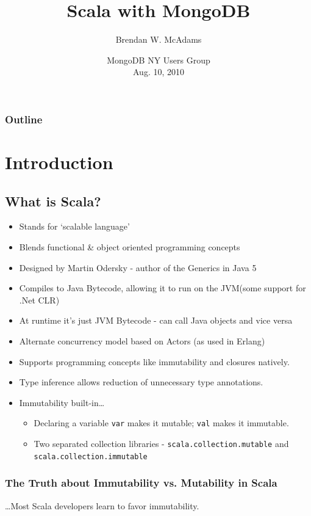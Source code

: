 \documentclass{beamer}
\title[Integrating Scala + MongoDB]{Scala with MongoDB} %
\author[B.W. McAdams]{Brendan W. McAdams}
\institute[Novus Partners]{Novus Partners, Inc.}
\date[MongoDB NY - 8/10/10]
     {MongoDB NY Users Group\\ Aug. 10, 2010}
\newenvironment{itemizeframe}
               {\begin{frame}\startitemizeframe} 
               {\stopitemizeframe\end{frame}}
\newcommand\startitemizeframe{\begin{itemize}} \newcommand\stopitemizeframe{\end{itemize}}
\begin{document}
\begin{frame}
  \titlepage
\end{frame}

\begin{frame}
\frametitle{Outline}
  \tableofcontents
\end{frame}

\section{Introduction}

\subsection{What is Scala?}
\begin{itemizeframe}
    \frametitle{What Is Scala?}
    \item Stands for `scalable language'
    \item Blends functional \& object oriented programming concepts
    \item Designed by Martin Odersky - author of the Generics in Java 5
    \item Compiles to Java Bytecode, allowing it to run on the JVM(some support for .Net CLR)
    \item At runtime it's just JVM Bytecode - can call Java objects and vice versa    
    \item Alternate concurrency model based on Actors (as used in Erlang)
    \item Supports programming concepts like immutability and closures natively.
    \item Type inference allows reduction of unnecessary type annotations.
    \item Immutability built-in\ldots
        \begin{itemize}
            \item Declaring a variable \texttt{var} makes it mutable;  \texttt{val} makes it immutable.
            \item Two separated collection libraries - \texttt{scala.collection.mutable} and \texttt{scala.collection.immutable}
       
        \end{itemize}
\end{itemizeframe}
\begin{frame}
    \frametitle{The Truth about Immutability vs. Mutability in Scala}
     {\huge \ldots Most Scala developers learn to favor immutability.}
\end{frame}
\end{document}
